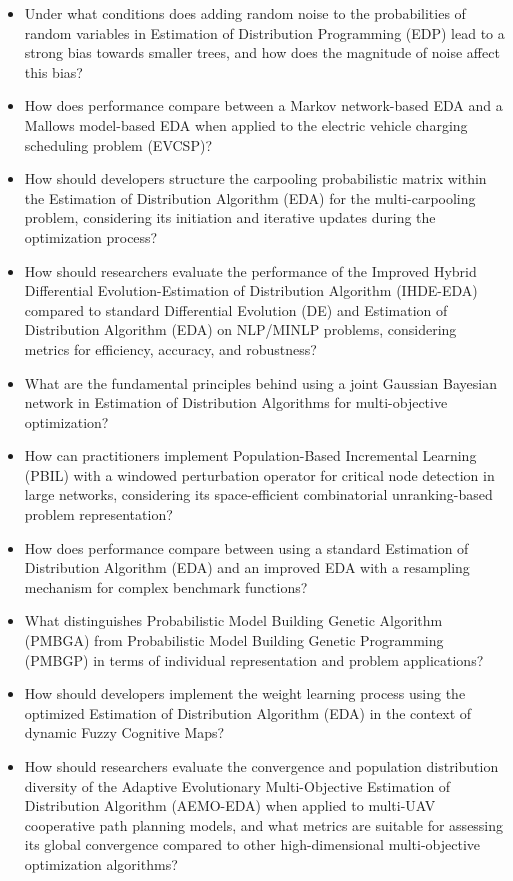 \begin{itemize}[noitemsep]
    \item Under what conditions does adding random noise to the probabilities of random variables in Estimation of Distribution Programming (EDP) lead to a strong bias towards smaller trees, and how does the magnitude of noise affect this bias?
    \item How does performance compare between a Markov network-based EDA and a Mallows model-based EDA when applied to the electric vehicle charging scheduling problem (EVCSP)?
    \item How should developers structure the carpooling probabilistic matrix within the Estimation of Distribution Algorithm (EDA) for the multi-carpooling problem, considering its initiation and iterative updates during the optimization process?
    \item How should researchers evaluate the performance of the Improved Hybrid Differential Evolution-Estimation of Distribution Algorithm (IHDE-EDA) compared to standard Differential Evolution (DE) and Estimation of Distribution Algorithm (EDA) on NLP/MINLP problems, considering metrics for efficiency, accuracy, and robustness?
    \item What are the fundamental principles behind using a joint Gaussian Bayesian network in Estimation of Distribution Algorithms for multi-objective optimization?
    \item How can practitioners implement Population-Based Incremental Learning (PBIL) with a windowed perturbation operator for critical node detection in large networks, considering its space-efficient combinatorial unranking-based problem representation?
    \item How does performance compare between using a standard Estimation of Distribution Algorithm (EDA) and an improved EDA with a resampling mechanism for complex benchmark functions?
    \item What distinguishes Probabilistic Model Building Genetic Algorithm (PMBGA) from Probabilistic Model Building Genetic Programming (PMBGP) in terms of individual representation and problem applications?
    \item How should developers implement the weight learning process using the optimized Estimation of Distribution Algorithm (EDA) in the context of dynamic Fuzzy Cognitive Maps?
    \item How should researchers evaluate the convergence and population distribution diversity of the Adaptive Evolutionary Multi-Objective Estimation of Distribution Algorithm (AEMO-EDA) when applied to multi-UAV cooperative path planning models, and what metrics are suitable for assessing its global convergence compared to other high-dimensional multi-objective optimization algorithms?

\end{itemize}
